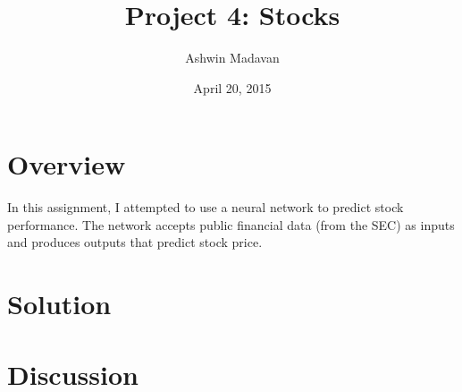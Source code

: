 \documentclass{article}
\begin{document}
\title{Project 4: Stocks}
\date{April 20, 2015}
\author{Ashwin Madavan}
\maketitle

\section{Overview}
In this assignment, I attempted to use a neural network to predict stock
performance. The network accepts public financial data (from the SEC) as inputs
and produces outputs that predict stock price.

\section{Solution}

\section{Discussion}
\end{document}
